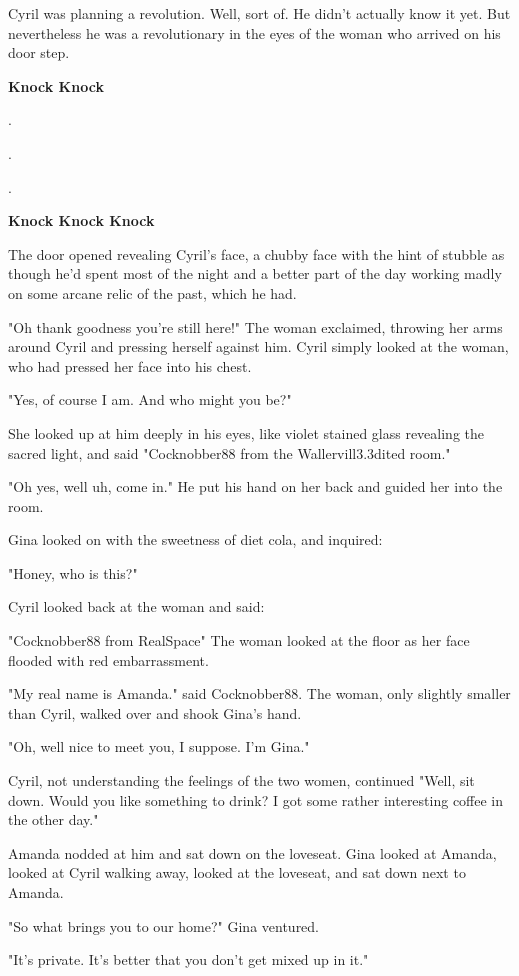 \documentclass[12pt]{book}
\begin{document}
Cyril was planning a revolution. Well, sort of. He didn't actually know it yet. But nevertheless he was a revolutionary in the eyes of the woman who arrived on his door step.

\textbf{Knock Knock}

.

.

.

\textbf{Knock Knock Knock}

The door opened revealing Cyril's face, a chubby face with the hint of stubble as though he'd spent most of the night and a better part of the day working madly on some arcane relic of the past, which he had. 

"Oh thank goodness you're still here!" The woman exclaimed, throwing her arms around Cyril and pressing herself against him. Cyril simply looked at the woman, who had pressed her face into his chest.

"Yes, of course I am. And who might you be?"

She looked up at him deeply in his eyes, like violet stained glass revealing the sacred light, and said "Cocknobber88 from the Wallervill3.3dited room."

"Oh yes, well uh, come in." He put his hand on her back and guided her into the room.

Gina looked on with the sweetness of diet cola, and inquired:

"Honey, who is this?"

Cyril looked back at the woman and said:

"Cocknobber88 from RealSpace" The woman looked at the floor as her face flooded with red embarrassment.

"My real name is Amanda." said Cocknobber88. The woman, only slightly smaller than Cyril, walked over and shook Gina's hand.

"Oh, well nice to meet you, I suppose. I'm Gina."

Cyril, not understanding the feelings of the two women, continued "Well, sit down. Would you like something to drink? I got some rather interesting coffee in the other day." 

Amanda nodded at him and sat down on the loveseat. Gina looked at Amanda, looked at Cyril walking away, looked at the loveseat, and sat down next to Amanda.

"So what brings you to our home?" Gina ventured.

"It's private. It's better that you don't get mixed up in it."
\end{document}
